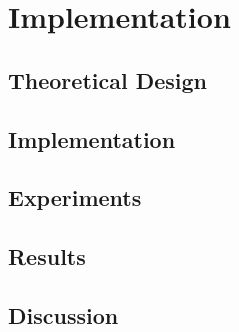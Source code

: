 \chapter{Implementation}
\label{ch:Implementation}

\section{Theoretical Design}

\section{Implementation}

\section{Experiments}

\section{Results}

\section{Discussion}

